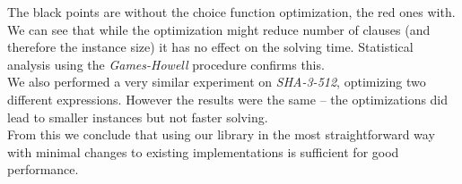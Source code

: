 \documentclass[myposter,portrait]{sciposter}
\def\mysection#1{
{\color{sectionCol}\section*{\sc\bfseries #1}}}
\begin{document}
\begin{multicols*}{3}
The black points are without the choice function optimization, the red ones with.
We can see that while the optimization might reduce number of clauses (and therefore the instance size) it has no effect on the solving time.
Statistical analysis using the \emph{Games-Howell} procedure \cite{games1976pairwise} confirms this.
~\\

We also performed a very similar experiment on \emph{SHA-3-512}, optimizing two different expressions.
However the results were the same -- the optimizations did lead to smaller instances but not faster solving.
~\\

From this we conclude that using our library in the most straightforward way with minimal changes to existing implementations is sufficient for good performance.







\end{multicols*}
\end{document}
